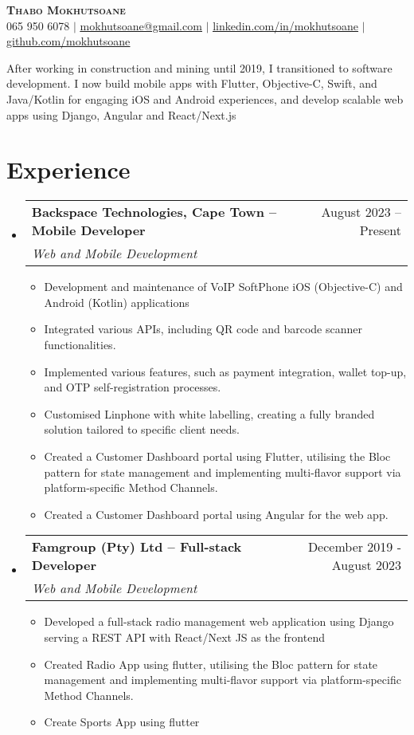 \documentclass[letterpaper,11pt]{article}
\makeatletter
\newcommand{\resumeItem}[1]{
  \item\small{
    {#1 \vspace{-2pt}}
  }
}
\newcommand{\resumeSubheading}[4]{
  \vspace{-2pt}\item
    \begin{tabular*}{0.97\textwidth}[t]{l@{\extracolsep{\fill}}r}
      \textbf{#1} & #2 \\
      \textit{\small#3} & \textit{\small #4} \\
    \end{tabular*}\vspace{-7pt}
}
\newcommand{\resumeSubHeadingListStart}{\begin{itemize}[leftmargin=0.15in, label={}]}
\newcommand{\resumeSubHeadingListEnd}{\end{itemize}}
\newcommand{\resumeItemListStart}{\begin{itemize}}
\newcommand{\resumeItemListEnd}{\end{itemize}\vspace{-5pt}}
\makeatother
\begin{document}

\begin{center}
    \textbf{\Huge \scshape Thabo Mokhutsoane} \\ \vspace{1pt}
    \small 065 950 6078 $|$ \href{mailto:mokhutsoane@gmail.com}{\underline{mokhutsoane@gmail.com}} $|$ 
    \href{https://linkedin.com/in/mokhutsoane}{\underline{linkedin.com/in/mokhutsoane}} $|$
    \href{https://github.com/mokhutsoane}{\underline{github.com/mokhutsoane}}
\end{center}


{After working in construction and mining until 2019, I transitioned to software development. I now build mobile apps with Flutter, Objective-C, Swift, and Java/Kotlin for engaging iOS and Android experiences, and develop scalable web apps using Django, Angular and React/Next.js}

\section{Experience}
  \resumeSubHeadingListStart
    \resumeSubheading
      {Backspace Technologies, Cape Town -- Mobile Developer}{August 2023 -- Present}
      {Web and Mobile Development}{}
      \resumeItemListStart
            \resumeItem{Development and maintenance of VoIP SoftPhone iOS (Objective-C) and Android (Kotlin) applications}
            \resumeItem{Integrated various APIs, including QR code and barcode scanner functionalities.}
            \resumeItem{Implemented various features, such as payment integration, wallet top-up, and OTP self-registration processes. }
            \resumeItem{Customised Linphone with white labelling, creating a fully branded solution tailored to specific client needs.}
            \resumeItem{Created a Customer Dashboard portal using Flutter, utilising the Bloc pattern for state management and implementing multi-flavor support via platform-specific Method Channels.}
            \resumeItem{Created a Customer Dashboard portal using Angular for the web app.}
      \resumeItemListEnd 
      {}
    \resumeSubheading
      {Famgroup (Pty) Ltd -- Full-stack Developer}{December 2019 - August 2023}
      {Web and Mobile Development}{}
      \resumeItemListStart
        \resumeItem{Developed a full-stack radio management web application using  Django serving a REST API with React/Next JS as the frontend}
        \resumeItem{Created Radio App using flutter, utilising the Bloc pattern for state management and implementing multi-flavor support via platform-specific Method Channels.}
        \resumeItem{Create Sports App using flutter}
    \resumeItemListEnd
    {}
  \resumeSubHeadingListEnd
\end{document}
